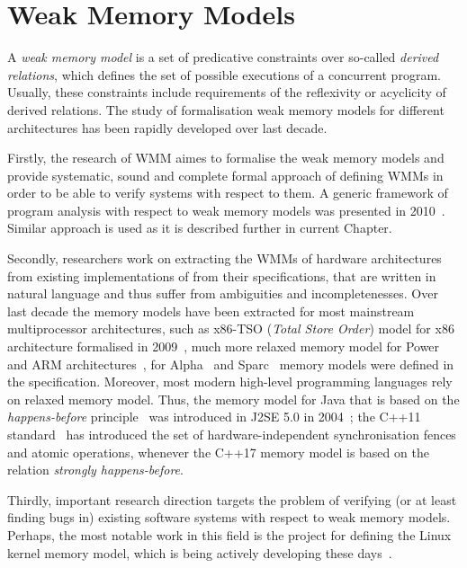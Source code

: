 \chapter{Weak Memory Models}
\label{ch:wmm}

A \textit{weak memory model} is a set of predicative constraints over so-called \textit{derived relations}, which defines the set of possible executions of a concurrent program.
Usually, these constraints include requirements of the reflexivity or acyclicity of derived relations.
The study of formalisation weak memory models for different architectures has been rapidly developed over last decade. 

Firstly, the research of WMM aimes to formalise the weak memory models and provide systematic, sound and complete formal approach of defining WMMs in order to be able to verify systems with respect to them.
A generic framework of program analysis with respect to weak memory models was presented in 2010~\cite{alglave2010shared}. Similar approach is used \Porthos as it is described
further in current Chapter.

Secondly, researchers work on extracting the WMMs of hardware architectures from existing implementations of from their specifications, that are written in natural language and thus suffer from ambiguities and incompletenesses. Over last decade the memory models have been extracted for most mainstream multiprocessor architectures, such as x86-TSO (\textit{Total Store Order}) model for x86 architecture formalised in 2009~\cite{owens2009better}, much more relaxed memory model for Power and ARM architectures~\cite{alglave2009semantics,sarkar2011understanding}, for Alpha~\cite{?} and Sparc~\cite{?} memory models were defined in the specification. Moreover, most modern high-level programming languages rely on relaxed memory model. Thus, the memory model for Java that is based on the \textit{happens-before} principle~\cite{lamport1978time} was introduced in J2SE 5.0 in 2004~\cite{manson2005java}; the C++11 standard~\cite{?} has introduced the set of hardware-independent synchronisation fences and atomic operations, whenever the C++17 memory model is based on the relation \textit{strongly happens-before}.

Thirdly, important research direction targets the problem of verifying (or at least finding bugs in) existing software systems with respect to weak memory models. Perhaps, the most notable work in this field is the project for defining the Linux kernel memory model, which is being actively developing these days~\cite{kernel1}.

